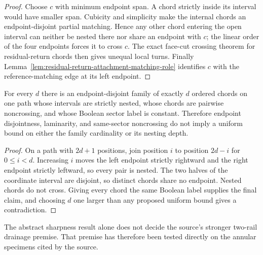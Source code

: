 \begin{proof}
Choose $c$ with minimum endpoint span.  A chord strictly inside its interval
would have smaller span.  Cubicity and simplicity make the internal chords an
endpoint-disjoint partial matching.  Hence any other chord entering the open
interval can neither be nested there nor share an endpoint with $c$; the
linear order of the four endpoints forces it to cross $c$.  The exact
face-cut crossing theorem for residual-return chords then gives unequal local
turns.  Finally
Lemma~\ref{lem:residual-return-attachment-matching-role} identifies $c$ with
the reference-matching edge at its left endpoint.
\end{proof}

\begin{lemma}
\label{lem:one-path-laminar-noncrossing-unbounded}
For every $d$ there is an endpoint-disjoint family of exactly $d$ ordered
chords on one path whose intervals are strictly nested, whose chords are
pairwise noncrossing, and whose Boolean sector label is constant.  Therefore
endpoint disjointness, laminarity, and same-sector noncrossing do not imply a
uniform bound on either the family cardinality or its nesting depth.
\end{lemma}

\begin{proof}
On a path with $2d+1$ positions, join position $i$ to position $2d-i$ for
$0\le i<d$.  Increasing $i$ moves the left endpoint strictly rightward and
the right endpoint strictly leftward, so every pair is nested.  The two
halves of the coordinate interval are disjoint, so distinct chords share no
endpoint.  Nested chords do not cross.  Giving every chord the same Boolean
label supplies the final claim, and choosing $d$ one larger than any proposed
uniform bound gives a contradiction.
\end{proof}

The abstract sharpness result alone does not decide the source's stronger
two-rail drainage premise.  That premise has therefore been tested directly
on the annular specimens cited by the source.

